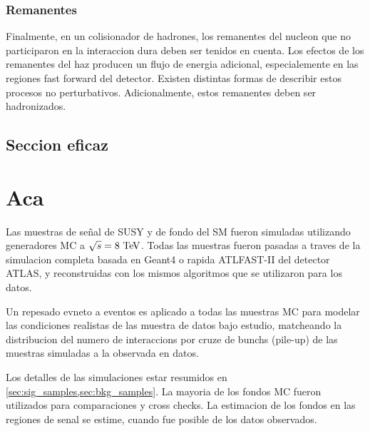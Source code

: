 \subsubsection{Remanentes}

Finalmente, en un colisionador de hadrones, los remanentes del nucleon
que no participaron en la interaccion dura deben ser tenidos en cuenta.
Los efectos de los remanentes del haz producen un flujo de energia adicional,
especialemente en las regiones fast forward del detector. Existen distintas
formas de describir estos procesos no perturbativos. Adicionalmente, estos
remanentes deben ser hadronizados.














\subsection{Seccion eficaz}











\section{Aca}

Las muestras de se\~nal de SUSY y de fondo del SM fueron simuladas utilizando generadores MC
a $\sqrt{s}=8\tev$.
Todas las muestras fueron pasadas a traves de la simulacion completa basada en Geant4\cite{Geant4,AtlasSim} o rapida
ATLFAST-II\cite{Richter-Was:683751} del detector ATLAS, y reconstruidas con los mismos algoritmos
que se utilizaron para los datos.

Un repesado evneto a eventos es aplicado a todas las muestras MC para modelar las condiciones
realistas de las muestra de datos bajo estudio, matcheando la distribucion del numero de interaccions
por cruze de bunchs (pile-up) de las muestras simuladas a la observada en datos.

Los detalles de las simulaciones estar resumidos en \cref{sec:sig_samples,sec:bkg_samples}.
La mayoria de los fondos MC fueron utilizados para comparaciones y cross checks.
La estimacion de los fondos en las regiones de senal se estime, cuando fue posible de los
datos observados.



